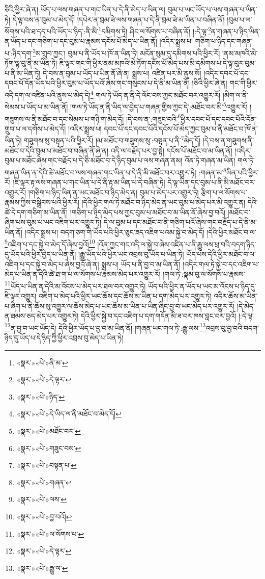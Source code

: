 ཅིའི་ཕྱིར་ཞེ་ན། ཡོད་པ་ལས་གཞན་པ་གང་ཡིན་པ་དེ་ནི་མེད་པ་ཡིན་ལ། བུམ་པ་ཡང་ཡོད་པ་ལས་གཞན་པ་ཡིན་ཏེ། དེ་ལྟ་བས་ན་བུམ་པ་མེད་དོ། །དཔེར་ན་བྲམ་ཟེ་ལས་གཞན་པ་དེ་ནི་བྲམ་ཟེ་མ་ཡིན་པ་བཞིན་ནོ། །བུམ་པ་ལ་སོགས་པའི་ཐ་དད་པའི་ཡོད་པ་ཉིད་:ནི་མི་\footnote{«སྣར་»«པེ་»ནི་མ་}དམིགས་ཏེ། ཤིང་ལ་སོགས་པ་བཞིན་ནོ། །:དེ་ལྟ་\footnote{«སྣར་»«པེ་»དེ་ལྟར་}ན་གཞན་པ་ཉིད་ཡིན་ན་ཡོད་པ་དང་གཅིག་པ་དང་བུམ་པ་རྣམས་དངོས་པོ་མེད་པ་ཡིན་ནོ། །འདིར་སྨྲས་པ། གཅིག་པ་ཉིད་དང་གཞན་པ་:ཉིད་དག་\footnote{«སྣར་»«པེ་»ཉིད་}མ་གྲུབ་ཀྱང་། བུམ་པ་ནི་ཡོད་པ་ཁོ་ན་ཡིན་ཏེ། མངོན་སུམ་དུ་དམིགས་པའི་ཕྱིར་རོ། །ནམ་མཁའི་མེ་ཏོག་ལྟ་བུ་ནི་མ་ཡིན་ཏེ། ཇི་ལྟར་གང་གི་ཕྱིར་ནམ་མཁའི་མེ་ཏོག་དངོས་པོ་མེད་པས་མི་དམིགས་པ་དེ་ལྟ་བུར་བུམ་པ་ནི་མ་ཡིན་ཏེ། དེ་བས་ན་བུམ་པ་ཡོད་པ་ཡིན་ནོ་ཞེ་ན། སྨྲས་པ། འཛིན་པར་མི་ནུས་སོ། །འདིར་དབང་པོ་དང་དབང་པོ་དོན་ཡོད་པའི་ཕྱིར་བུམ་པ་ཡོད་པའོ་ཞེས་གང་གསུངས་པ་དེ་ནི་མ་ཡིན་ནོ། །ཅིའི་ཕྱིར་ཞེ་ན། གང་གི་ཕྱིར་འདི་དག་ལ་འཛིན་པའི་ནུས་པ་མེད་དེ།\footnote{«སྣར་»«པེ་»དེ་ཡིད་ལ་ནི་མཐོང་བ་མེད་དོ།} གལ་ཏེ་ཡོད་ན་ནི་དེ་ལོང་བས་ཀྱང་མཐོང་བར་འགྱུར་རོ། །མིག་ལ་ནི་སེམས་པ་ཡོད་པ་མ་ཡིན་ནོ། །གལ་ཏེ་ཡོད་ན་ནི་ཡིད་ལ་བྱེད་པ་གཞན་གྱིས་ཀྱང་དེ་:མཐོང་བར་མི་\footnote{«སྣར་»«པེ་»མཐོང་བར་}འགྱུར་རོ། །གཟུགས་ལ་ནི་མཐོང་བ་དང་སེམས་པ་གཉི་ག་མེད་དོ། །དེ་བས་ན་:གཟུང་བའི་\footnote{«སྣར་»«པེ་»གཟུང་བས་}ཕྱིར་དབང་པོ་དང་དབང་པོའི་དོན་གྲུབ་པ་ལ་དགོས་པ་མེད་དོ། །འདིར་སྨྲས་པ། དབང་པོ་དང་དབང་པོའི་དངོས་པོ་མེད་ཀྱང་བུམ་པ་ནི་མཐོང་བ་ཁོ་ན་ཡིན་ཏེ། གཟུགས་སུ་བསྟན་པའི་ཕྱིར་རོ། །མ་མཐོང་བ་གཟུགས་སུ་:བསྟན་པ་ནི་\footnote{«སྣར་»«པེ་»བསྟན་པ་}མེད་དོ། །དེ་བས་ན་གཟུགས་ནི་མཐོང་བ་དེའི་བུམ་པ་མཐོང་བ་བཞིན་ནོ་ཞེ་ན། འདི་ལ་བརྗོད་པར་བྱ་སྟེ། དངོས་པོ་མཐོང་བ་མ་ཡིན་ནོ། །འདིར་བུམ་པ་མཐོང་ཞེས་གང་བརྗོད་པ་དེ་ཅི་མཐོང་བ་དེ་ཉིད་བུམ་པ་ལས་གཞན་ནམ། འོན་ཏེ་གཞན་མ་ཡིན། གལ་ཏེ་གཞན་ཡིན་ན་དེའི་ཚེ་མཐོང་བ་ལས་གཞན་གང་ཡིན་པ་དེ་ནི་མི་མཐོང་བར་འགྱུར་ཏེ། :གཞན་མ་\footnote{«སྣར་»«པེ་»གཞན་}ཡིན་པའི་ཕྱིར་རོ། །ཇི་ལྟར་རྟ་ལས་གཞན་པ་གང་ཡིན་པ་དེ་ནི་རྟ་མ་ཡིན་པ་དེ་བཞིན་ཏེ། དེ་ལྟ་ཡིན་དང་བུམ་པ་ནི་མི་མཐོང་བར་འགྱུར་རོ། །གཅིག་པ་ཉིད་ཡིན་ན་ཡང་མཐོང་བ་ཉིད་མེད་ན། བུམ་པ་མེད་པར་འགྱུར་ཏེ། རྩིག་པ་ལ་སོགས་པ་རྣམས་ཀྱིས་བསྒྲིབས་པའི་ཕྱིར་རོ། །དེའི་ཕྱིར་གལ་ཏེ་མཐོང་བ་ཉིད་མེད་ན་ཡང་བུམ་པ་མེད་པར་མི་འགྱུར་ན། དེའི་ཚེ་དེ་དག་གཅིག་མ་ཡིན་ནོ། །གཅིག་པ་ཉིད་མེད་པས་ཀྱང་བུམ་པ་མཐོང་བ་མ་ཡིན་ནོ་ཞེས་བྱ་བའོ། །མཐོང་བ་ཞིག་པས་བུམ་པ་ཡང་འཇིག་པར་འགྱུར་ཏེ། དེ་ལ་བུམ་པ་དང་མཐོང་བ་ནི་གཅིག་པའོ་ཞེས་གང་བརྗོད་པ་དེ་ནི་མ་ཡིན་ནོ། །འདིར་སྨྲས་པ། བདག་ཅག་གི་ཡོད་པའི་ཕྱིར་ཅུང་ཟད་འཇིག་པའམ་སྐྱེ་བ་མེད་དོ། །དེའི་ཕྱིར་མཐོང་བ་ལ་\footnote{«སྣར་»«པེ་»ལས་}འཇིག་པ་དང་སྐྱེ་བ་མེད་དོ་ཞེས་བྱའོ།\footnote{«སྣར་»«པེ་»བྱ་བའོ།} །འོན་ཀྱང་གང་འདི་ལ་སྐྱེ་བ་ཞེས་འཛིན་པ་ནི་རྒྱུ་ལས་ཕྲ་བའི་བདག་ཉིད་དུ་ཡོད་པའི་ཕྱིར་བྱེད་པ་ཡིན་ནོ། །རྒྱུ་ཡོད་པའི་ཕྱིར་ཡང་འབྲས་བུ་ཡོད་པ་ཡིན་ཏེ། ཡོད་པས་དེའི་ཕྱིར་མཐོང་བ་ལ་འཇིག་པ་དང་སྐྱེ་བ་མེད་པ་ཞེས་བྱའོ་ཞེ་ན། སྨྲས་པ། ཡོད་པ་ནི་བྱ་བ་མ་ཡིན་ནོ། །འདིར་གལ་ཏེ་སྐྱེ་བ་དང་འཇིག་པ་མེད་པ་ཡིན་ན་དེའི་ཚེ་ཐ་ག་པ་ལ་སོགས་པ་རྣམས་མེད་པར་འགྱུར་རོ། །གལ་ཏེ་:སྣམ་བུ་ལ་སོགས་པ་རྣམས་\footnote{«སྣར་»«པེ་»ལ་སོགས་པ་}ཡོད་པ་ཡིན་ན་དེའི་མ་འོངས་པ་མེད་པར་ཐལ་བར་འགྱུར་ཏེ། ཡོད་པའི་ཕྱིར་ན་ཡོད་པ་ཡང་མ་འོངས་པ་ཉིད་དུ་ཇི་ལྟར་འགྱུར། འཇིག་པ་མེད་པའི་ཕྱིར་ཡང་ཆོས་དང་ཆོས་མ་ཡིན་པ་དག་མེད་པར་འགྱུར་ཏེ། འདིར་ཆོས་མ་ཡིན་པ་ཞིག་པ་ནི་ཆོས་སུ་འགྱུར་ལ་ཆོས་མེད་པ་ཡང་ཆོས་མ་ཡིན་པ་ཡིན་ཞིང་བྱ་བ་ཡང་མེད་པར་འགྱུར་རོ། །དེ་མེད་ན་ཐམས་ཅད་མེད་པར་འགྱུར་ཏེ། དེའི་ཕྱིར་སྐྱེ་བ་དང་འཇིག་པ་དག་གདོན་མི་ཟ་བར་ཁས་བླང་བར་བྱའོ། །:དེ་ལྟ་\footnote{«སྣར་»«པེ་»དེ་ལྟར་}ན་བྱ་བ་ཡང་ཡོད་དེ། དེའི་ཕྱིར་ཡོད་པ་བྱ་བ་མ་ཡིན་ནོ། །གཞན་ཡང་གལ་ཏེ་:རྒྱུ་ལས་\footnote{«སྣར་»«པེ་»རྒྱུ་ལ་}འབྲས་བུ་བྱ་བའི་བདག་ཉིད་དུ་ཡོད་པ་དེ་ཉིད་ཀྱི་ཕྱིར་འབྲས་བུ་མེད་པ་ཡིན་ཏེ། 